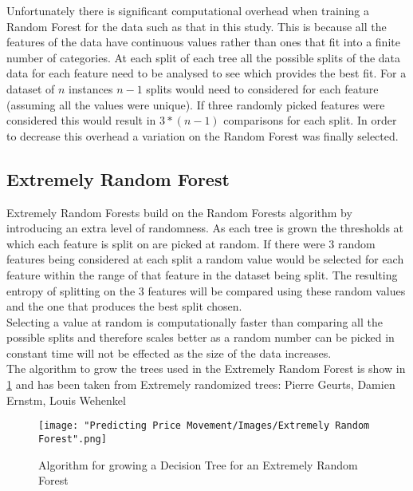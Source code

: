 		Unfortunately there is significant computational overhead when training a Random Forest for the data such as that in this study. This is because all the features of the data have continuous values rather than ones that fit into a finite number of categories. At each split of each tree all the possible splits of the data data for each feature need to be analysed to see which provides the best fit. For a dataset of $n$ instances $n - 1$ splits would need to considered for each feature (assuming all the values were unique). If three randomly picked features were considered this would result in $3 * (n - 1)$ comparisons for each split. In order to decrease this overhead a variation on the Random Forest was finally selected.
		
		\subsection{Extremely Random Forest}
		
		Extremely Random Forests\cite{geurts2006extremely} build on the Random Forests algorithm by introducing an extra level of randomness. As each tree is grown the thresholds at which each feature is split on are picked at random. If there were 3 random features being considered at each split a random value would be selected for each feature within the range of that feature in the dataset being split. The resulting entropy of splitting on the 3 features will be compared using these random values and the one that produces the best split chosen.\\
			
			Selecting a value at random is computationally faster than comparing all the possible splits and therefore scales better as a random number can be picked in constant time will not be effected as the size of the data increases.\\
		
		The algorithm to grow the trees used in the Extremely Random Forest is show in \ref{fig:extremelyRandomForestTree} and has been taken from Extremely randomized trees: Pierre Geurts, Damien Ernstm, Louis Wehenkel\cite{geurts2006extremely}
		
			\begin{figure}[H]
				\texttt{[image: "Predicting Price Movement/Images/Extremely Random Forest".png]}
				\centering
				\caption{Algorithm for growing a Decision Tree for an Extremely Random Forest}
    				\label{fig:extremelyRandomForestTree}
			\end{figure}		
 
